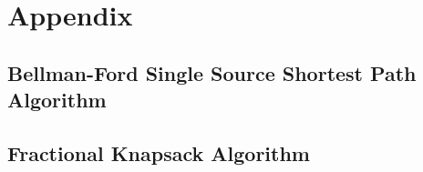 \documentclass[letterpaper, 10pt,DIV=13]{scrartcl}
\numberwithin{equation}{section} %
\numberwithin{figure}{section} %
\numberwithin{table}{section} %
\begin{document}
\section{Appendix}
\subsection{Bellman-Ford Single Source Shortest Path Algorithm}


\subsection{Fractional Knapsack Algorithm}

\end{document}
